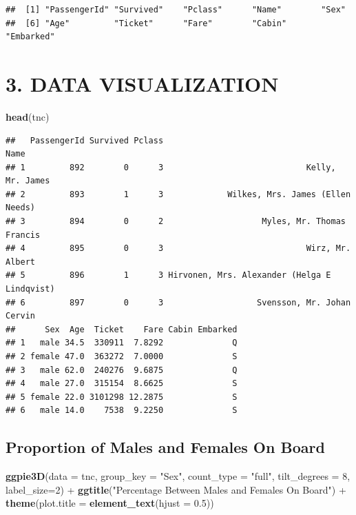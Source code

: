 \documentclass[
]{article}
\newenvironment{Shaded}{\begin{snugshade}}{\end{snugshade}}
\newcommand{\AttributeTok}[1]{\textcolor[rgb]{0.74,0.68,0.62}{#1}}
\newcommand{\DecValTok}[1]{\textcolor[rgb]{0.27,0.67,0.26}{#1}}
\newcommand{\FloatTok}[1]{\textcolor[rgb]{0.27,0.67,0.26}{#1}}
\newcommand{\FunctionTok}[1]{\textcolor[rgb]{1.00,0.58,0.35}{\textbf{#1}}}
\newcommand{\NormalTok}[1]{\textcolor[rgb]{0.74,0.68,0.62}{#1}}
\newcommand{\SpecialCharTok}[1]{\textcolor[rgb]{0.02,0.61,0.04}{#1}}
\newcommand{\StringTok}[1]{\textcolor[rgb]{0.02,0.61,0.04}{#1}}
\begin{document}
\begin{verbatim}
##  [1] "PassengerId" "Survived"    "Pclass"      "Name"        "Sex"        
##  [6] "Age"         "Ticket"      "Fare"        "Cabin"       "Embarked"
\end{verbatim}

\hypertarget{data-visualization}{%
\section{3. DATA VISUALIZATION}\label{data-visualization}}

\begin{Shaded}
\begin{Highlighting}[]
\FunctionTok{head}\NormalTok{(tnc)}
\end{Highlighting}
\end{Shaded}

\begin{verbatim}
##   PassengerId Survived Pclass                                         Name
## 1         892        0      3                             Kelly, Mr. James
## 2         893        1      3             Wilkes, Mrs. James (Ellen Needs)
## 3         894        0      2                    Myles, Mr. Thomas Francis
## 4         895        0      3                             Wirz, Mr. Albert
## 5         896        1      3 Hirvonen, Mrs. Alexander (Helga E Lindqvist)
## 6         897        0      3                   Svensson, Mr. Johan Cervin
##      Sex  Age  Ticket    Fare Cabin Embarked
## 1   male 34.5  330911  7.8292              Q
## 2 female 47.0  363272  7.0000              S
## 3   male 62.0  240276  9.6875              Q
## 4   male 27.0  315154  8.6625              S
## 5 female 22.0 3101298 12.2875              S
## 6   male 14.0    7538  9.2250              S
\end{verbatim}

\hypertarget{proportion-of-males-and-females-on-board}{%
\subsection{Proportion of Males and Females On
Board}\label{proportion-of-males-and-females-on-board}}

\begin{Shaded}
\begin{Highlighting}[]
\FunctionTok{ggpie3D}\NormalTok{(}\AttributeTok{data =}\NormalTok{ tnc, }\AttributeTok{group\_key =} \StringTok{"Sex"}\NormalTok{, }
        \AttributeTok{count\_type =} \StringTok{"full"}\NormalTok{, }
        \AttributeTok{tilt\_degrees =} \DecValTok{8}\NormalTok{, }
        \AttributeTok{label\_size=}\DecValTok{2}\NormalTok{) }\SpecialCharTok{+} 
  \FunctionTok{ggtitle}\NormalTok{(}\StringTok{"Percentage Between Males and Females On Board"}\NormalTok{) }\SpecialCharTok{+} 
  \FunctionTok{theme}\NormalTok{(}\AttributeTok{plot.title =} \FunctionTok{element\_text}\NormalTok{(}\AttributeTok{hjust =} \FloatTok{0.5}\NormalTok{))}
\end{Highlighting}
\end{Shaded}
\end{document}
